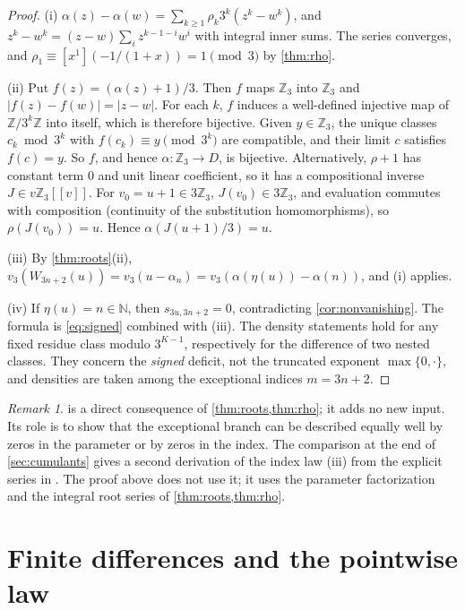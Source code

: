 \documentclass[11pt,reqno]{amsart}
\theoremstyle{definition}
\theoremstyle{remark}
\newtheorem{remark}[theorem]{Remark}
\theoremstyle{plain}
\newcommand{\Z}{\mathbb Z}
\newcommand{\N}{\mathbb N}
\begin{document}
\begin{proof}
(i) $\alpha(z)-\alpha(w)=\sum_{k\ge1}\rho_k3^k(z^k-w^k)$, and $z^k-w^k=(z-w)\sum_iz^{k-1-i}w^i$ with integral inner sums. The series converges, and $\rho_1\equiv[x^1](-1/(1+x))=1\pmod 3$ by \cref{thm:rho}.

(ii) Put $f(z)=(\alpha(z)+1)/3$. Then $f$ maps $\Z_3$ into $\Z_3$ and $|f(z)-f(w)|=|z-w|$. For each $k$, $f$ induces a well-defined injective map of $\Z/3^k\Z$ into itself, which is therefore bijective. Given $y\in\Z_3$, the unique classes $c_k\bmod3^k$ with $f(c_k)\equiv y\pmod{3^k}$ are compatible, and their limit $c$ satisfies $f(c)=y$. So $f$, and hence $\alpha\colon\Z_3\to D$, is bijective. Alternatively, $\rho+1$ has constant term $0$ and unit linear coefficient, so it has a compositional inverse $J\in v\Z_3[[v]]$. For $v_0=u+1\in3\Z_3$, $J(v_0)\in3\Z_3$, and evaluation commutes with composition (continuity of the substitution homomorphisms), so $\rho(J(v_0))=u$. Hence $\alpha(J(u+1)/3)=u$.

(iii) By \cref{thm:roots}(ii), $v_3(W_{3n+2}(u))=v_3(u-\alpha_n)=v_3(\alpha(\eta(u))-\alpha(n))$, and (i) applies.

(iv) If $\eta(u)=n\in\N$, then $s_{3u,3n+2}=0$, contradicting \cref{cor:nonvanishing}. The formula is \eqref{eq:signed} combined with (iii). The density statements hold for any fixed residue class modulo $3^{K-1}$, respectively for the difference of two nested classes. They concern the \emph{signed} deficit, not the truncated exponent $\max\{0,\cdot\}$, and densities are taken among the exceptional indices $m=3n+2$.
\end{proof}

\begin{remark}
 is a direct consequence of \cref{thm:roots,thm:rho}; it adds no new input. Its role is to show that the exceptional branch can be described equally well by zeros in the parameter or by zeros in the index. The comparison at the end of \cref{sec:cumulants} gives a second derivation of the index law (iii) from the explicit series in \cite[Thm.~12.1]{Kallat2026a}. The proof above does not use it; it uses the parameter factorization and the integral root series of \cref{thm:roots,thm:rho}.
\end{remark}

\section{Finite differences and the pointwise law}\label{sec:mahler}
\end{document}
